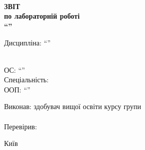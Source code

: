 
\newlength{\rightshift}
\setlength{\rightshift}{35pt}

\thispagestyle{empty}

{%
\begin{Center}
	{\large\university{}\\
	\faculty{}}
\end{Center}

\vspace*{\fill}

\begin{Center}
	 {\bfseries\Large
		 ЗВІТ\\
		 по лабораторній роботі \prodnumber{}\\
		 \enquote{\worktheme{}}
	 }
\end{Center}

\vspace*{.6cm}

\begin{Center}
	Дисципліна: \enquote{\subjectname{}}
\end{Center}

\vspace*{.8cm}

\begin{RaggedRight}
	\faculty\\
	ОС: \enquote{\os}\\
	Спеціальність: \speciality\\
	ООП: \enquote{\oop}
\end{RaggedRight}

\vspace*{\fill}

\begin{RaggedRight}
	Виконав: здобувач вищої освіти \course{} курсу \groupnumber{} групи\\
	\studentname{}\\
	Перевірив: \teachername{}
\end{RaggedRight}

\vspace*{\fill}

\begin{Center}
	Київ \the\year{}
\end{Center}
}

\pagebreak
\hypertarget{tocLink}{{\sffamily\tableofcontents}}
\pagebreak